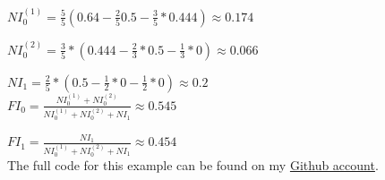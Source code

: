 $NI_0^{(1)} = \frac{5}{5}(0.64-\frac{2}{5}0.5-\frac{3}{5}*0.444) \approx 0.174$

$NI_0^{(2)} = \frac{3}{5}*(0.444-\frac{2}{3}*0.5-\frac{1}{3}*0) \approx 0.066$

$NI_1 = \frac{2}{5}*(0.5- \frac{1}{2}*0- \frac{1}{2}*0) \approx 0.2$ \\

$FI_0 = \frac{NI_0^{(1)} + NI_0^{(2)}}{NI_0^{(1)} + NI_0^{(2)} + NI_1} \approx 0.545$

$FI_1 = \frac{NI_1}{NI_0^{(1)} + NI_0^{(2)} + NI_1} \approx 0.454$ \\

The full code for this example can be found on my \href{https://github.com/savoga/various_projects/blob/master/trees_feature_importance.py}{Github account}.

\vspace{5mm}